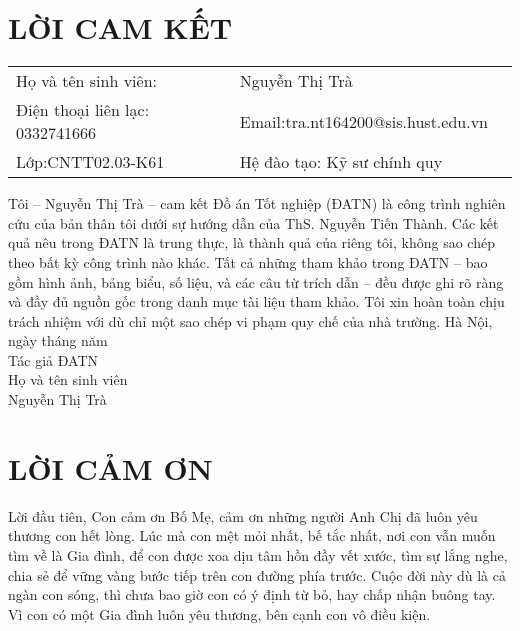 \documentclass{article}
\begin{document}
\section*{LỜI CAM KẾT}
\begin{table}[H]
    \begin{tabular}{l l l}
     \fontsize{13pt}{0pt}\selectfont Họ và tên sinh viên:& \fontsize{13pt}{0pt}\selectfont Nguyễn Thị Trà \vspace{6pt}\\
     \fontsize{13pt}{0pt}\selectfont Điện thoại liên lạc: 0332741666& \fontsize{13pt}{0pt}\selectfont Email:tra.nt164200@sis.hust.edu.vn \vspace{6pt}\\
     \fontsize{13pt}{0pt}\selectfont Lớp:CNTT02.03-K61& \fontsize{13pt}{0pt}\selectfont Hệ đào tạo: Kỹ sư chính quy
    \end{tabular}
\end{table}
Tôi – Nguyễn Thị Trà – cam kết Đồ án Tốt nghiệp (ĐATN) là công trình nghiên cứu của bản thân tôi dưới sự hướng dẫn của ThS. Nguyễn Tiến Thành. Các kết quả nêu trong ĐATN là trung thực, là thành quả của riêng tôi, không sao chép theo bất kỳ công trình nào khác. Tất cả những tham khảo trong ĐATN – bao gồm hình ảnh, bảng biểu, số liệu, và các câu từ trích dẫn – đều được ghi rõ ràng và đầy đủ nguồn gốc trong danh mục tài liệu tham khảo. Tôi xin hoàn toàn chịu trách nhiệm với dù chỉ một sao chép vi phạm quy chế của nhà trường.
\vspace{6pt}					
\hspace{7cm} Hà Nội, ngày    tháng    năm\\

\hspace{6.5cm} {Tác giả ĐATN}\\


\hspace{6.3cm} Họ và tên sinh viên\\

\hspace{6.5cm} Nguyễn Thị Trà


\thispagestyle{empty}
\section*{LỜI CẢM ƠN}
\thispagestyle{empty}
Lời đầu tiên, Con cảm ơn Bố Mẹ, cảm ơn những người Anh Chị đã luôn yêu thương con hết lòng. Lúc mà con mệt mỏi nhất, bế tắc nhất, nơi con vẫn muốn tìm về là Gia đình, để con được xoa dịu tâm hồn đầy vết xước, tìm sự lắng nghe, chia sẻ để vững vàng bước tiếp trên con đường phía trước. Cuộc đời này dù là cả ngàn con sóng, thì chưa bao giờ con có ý định từ bỏ, hay chấp nhận buông tay. Vì con có một Gia đình luôn yêu thương, bên cạnh con vô điều kiện.
\cleardoublepage
\end{document}
